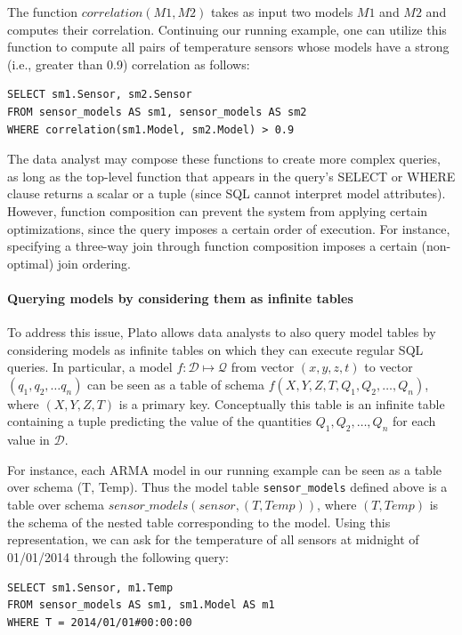 \vspace*{0.5cm}
\begin{example}
The function $correlation(M1, M2)$ takes as input two models $M1$ and $M2$ and computes their correlation. Continuing our running example, one can utilize this function to compute all pairs of temperature sensors whose models have a strong (i.e., greater than 0.9) correlation as follows:
\begin{verbatim}
SELECT sm1.Sensor, sm2.Sensor
FROM sensor_models AS sm1, sensor_models AS sm2
WHERE correlation(sm1.Model, sm2.Model) > 0.9
\end{verbatim}
\end{example}
\vspace*{0.5cm}

The data analyst may compose these functions to create more complex queries, as long as the top-level function that appears in the query's SELECT or WHERE clause returns a scalar or a tuple (since SQL cannot interpret model attributes). However, function composition can prevent the system from applying certain optimizations, since the query imposes a certain order of execution. For instance, specifying a three-way join through function composition imposes a certain (non-optimal) join ordering. \\

\paragraph{Querying models by considering them as infinite tables} To address this issue, Plato allows data analysts to also query model tables by considering models as infinite tables on which they can execute regular SQL queries. In particular, a model $f: \mathcal{D} \mapsto \mathcal{Q}$ from vector $(x, y, z, t)$ to vector $(q_1, q_2, \ldots q_n)$ can be seen as a table of schema $f(X, Y, Z, T, Q_1, Q_2, \ldots, Q_n)$, where $(X, Y, Z, T)$ is a primary key. Conceptually this table is an infinite table containing a tuple predicting the value of the quantities $Q_1, Q_2, \ldots, Q_n$ for each value in $\mathcal{D}$.

\vspace*{0.5cm}
\begin{example}
\label{xmpl:query-infinite-tables}
For instance, each ARMA model in our running example can be seen as a table over schema (T, Temp). Thus the model table \texttt{sensor\_models} defined above is a table over schema $sensor\_models(sensor, (T, Temp))$, where $(T, Temp)$ is the schema of the nested table corresponding to the model. Using this representation, we can ask for the temperature of all sensors at midnight of 01/01/2014 through the following query:

\begin{verbatim}
SELECT sm1.Sensor, m1.Temp
FROM sensor_models AS sm1, sm1.Model AS m1
WHERE T = 2014/01/01#00:00:00
\end{verbatim}
\end{example}
\vspace*{0.5cm}


